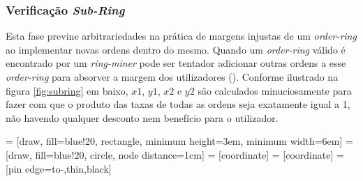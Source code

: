 \documentclass[UTF8,nofonts]{article}
\makeatletter
\newenvironment{figurehere}
 {\def\@captype{figure}}
 {}
\makeatother
\begin{document}
\begin{multicols}{2}
\begin{enumerate}
\subsubsection{Verificação \textit{Sub-Ring}\label{sec:sub_ring_check}}


Esta fase previne arbitrariedades na prática de margens injustas de um \textit{order-ring} ao implementar novas ordens dentro do mesmo. Quando um \textit{order-ring} válido é encontrado por um \textit{ring-miner} pode ser tentador adicionar outras ordens a esse \textit{order-ring} para absorver a margem dos utilizadores (). Conforme ilustrado na figura \ref{fig:subring} em baixo, $x1$, $y1$, $x2$ e $y2$ são calculados minuciosamente para fazer com que o produto das taxas de todas as ordens seja exatamente igual a 1, não havendo qualquer desconto nem benefício para o utilizador.

\begin{center}
\begin{figurehere}
\centering
{} = [draw, fill=blue!20, rectangle, 
    minimum height=3em, minimum width=6em]
 = [draw, fill=blue!20, circle, node distance=1cm]
 = [coordinate]
 = [coordinate]
 = [pin edge={to-,thin,black}]

\end{figurehere}
\end{center}
\end{enumerate}
\end{multicols}
\end{document}
